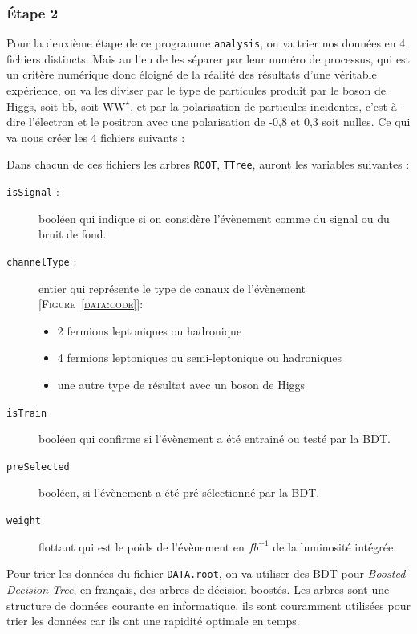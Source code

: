 \documentclass[10pt,a4paper]{report}
\newcommand{\cad}{c'est-à-dire\xspace}
\newcommand{\ROOT}{\texttt{ROOT}\xspace}
\newcommand{\analysis}{\texttt{analysis}\xspace}
\newcommand{\bbar}{\overline{b}}
\newcommand{\Wstar}{W^{\star}}
\newcommand{\bb}{$\mathrm{b\bbar}$}
\newcommand{\WW}{$\mathrm{W\Wstar}$}
\newcommand{\Figure}[1]{[\textsc{Figure~#1}]}
\begin{document}
\subsubsection{Étape 2}

Pour la deuxième étape de ce programme \analysis, on va trier nos données en 4 fichiers distincts. 
Mais au lieu de les séparer par leur numéro de processus, qui est un critère numérique donc éloigné de la réalité des résultats d'une véritable expérience, on va les diviser par le type de particules produit par le boson de Higgs, soit \bb, soit \WW, et par la polarisation de particules incidentes, \cad l'électron et le positron avec une polarisation de -0,8 et 0,3 soit nulles.
Ce qui va nous créer les 4 fichiers suivants :



Dans chacun de ces fichiers les arbres \ROOT, \texttt{TTree}, auront les variables suivantes :

\begin{description}

	\item[\texttt{isSignal} :] booléen qui indique si on considère l'évènement comme du signal ou du bruit de fond.
	
	\item[\texttt{channelType} :] entier qui représente le type de canaux de l'évènement \Figure{\ref{data:code}}:
	\begin{itemize}
		\item 2 fermions leptoniques ou hadronique 
		\item 4 fermions leptoniques ou semi-leptonique ou hadroniques 
		\item une autre type de résultat avec un boson de Higgs
	\end{itemize}
	
	\item[\texttt{isTrain}] booléen qui confirme si l'évènement a été entrainé ou testé par la BDT.
	
	\item[\texttt{preSelected}] booléen, si l'évènement a été pré-sélectionné par la BDT.
	
	\item[\texttt{weight}] flottant qui est le poids de l'évènement en $fb^{-1}$ de la luminosité intégrée.
	
\end{description}


Pour trier les données du fichier \texttt{DATA.root}, on va utiliser des BDT pour \textit{Boosted Decision Tree}, en français, des arbres de décision boostés. 
Les arbres sont une structure de données courante en informatique, ils sont couramment utilisées pour trier les données car ils ont une rapidité optimale en temps. 
\end{document}

